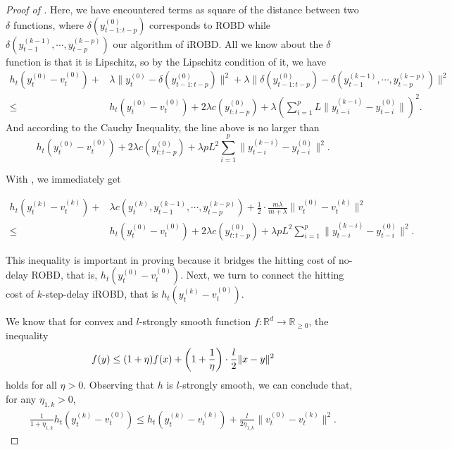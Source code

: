 \begin{proof}[Proof of ]
Here, we have encountered terms as square of the distance between two $\delta$ functions, where $\delta(y_{t-1:t-p}^{(0)})$ corresponds to ROBD while $\delta(y_{t-1}^{(k-1)},\cdots,y_{t-p}^{(k-p)})$ our algorithm of iROBD. All we know about the $\delta$ function is that it is Lipschitz, so by the Lipschitz condition of it, we have 
\begin{equation}\label{appendix.c.16.3}
\begin{split}
     h_t(y_t^{(0)}-v_t^{(0)})+&\lambda\|y_t^{(0)}-\delta(y_{t-1:t-p}^{(0)})\|^2+\lambda\|\delta(y_{t-1:t-p}^{(0)})-\delta(y_{t-1}^{(k-1)},\cdots,y_{t-p}^{(k-p)})\|^2\\
\le&h_t(y_t^{(0)}-v_t^{(0)})+2\lambda c(y_{t:t-p}^{(0)})+\lambda(\sum_{i=1}^pL\|y_{t-i}^{(k-i)}-y_{t-i}^{(0)}\|)^2.
\end{split}
\end{equation}
And according to the Cauchy Inequality, the line above is no larger than
\begin{equation}\label{appendix.c.16.4}
    h_t(y_t^{(0)}-v_t^{(0)})+2\lambda c(y_{t:t-p}^{(0)})+\lambda pL^2\sum_{i=1}^p\|y_{t-i}^{(k-i)}-y_{t-i}^{(0)}\|^2.
\end{equation}

With , we immediately get

\begin{equation}\label{appendix.c.1}
\begin{split}
    h_t(y_t^{(k)}-v_t^{(k)})+&\lambda c(y_t^{(k)},y_{t-1}^{(k-1)},\cdots,y_{t-p}^{(k-p)})+\frac{1}{2}\cdot\frac{m\lambda}{m+\lambda}\|v_t^{(0)}-v_t^{(k)}\|^2\\
\le&h_t(y_t^{(0)}-v_t^{(0)})+2\lambda c(y_{t:t-p}^{(0)})+\lambda pL^2\sum_{i=1}^p\|y_{t-i}^{(k-i)}-y_{t-i}^{(0)}\|^2.    
\end{split}
\end{equation}

This inequality is important in proving because it bridges the hitting cost of no-delay ROBD, that is, $h_t(y_t^{(0)}-v_t^{(0)})$. Next, we turn to connect the hitting cost of $k$-step-delay iROBD, that is $h_t(y_t^{(k)}-v_t^{(0)})$.

We know that for convex and $l$-strongly smooth function $f:\mathbb{R}^d\to\mathbb{R}_{\ge0}$, the inequality
\begin{align}
    f(y)\le(1+\eta)f(x)+\left(1+\frac{1}{\eta}\right)\cdot\frac{l}{2}\|x-y\|^2\notag
\end{align}
holds for all $\eta>0$. Observing that $h$ is $l$-strongly smooth, we can conclude that, for any $\eta_{1,k}>0$,
\begin{align}\label{appendix.c.2}
    \frac{1}{1+\eta_{1,k}}h_t(y_t^{(k)}-v_t^{(0)})\le h_t(y_t^{(k)}-v_t^{(k)})+\frac{l}{2\eta_{1,k}}\|v_t^{(0)}-v_t^{(k)}\|^2.
\end{align}


\end{proof}
